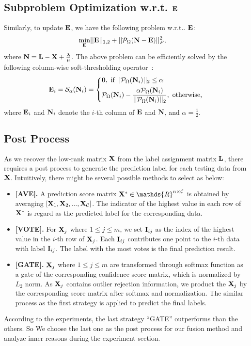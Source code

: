 \documentclass[letterpaper]{article} %
\def\calP{\mathcal{P}}
\def\bN{{\bf N}}
\def\bI{{\bf I}}
\def\bE{{\bf E}}
\def\blambda{{\bm \lambda}}
\def\calC{{\mathcal{C}}}
\def\calS{{\mathcal{S}}}
\def\bL{{\bf L}}
\def\dsR{\mathds{R}}
\def\bX{{\bf X}}
\def\bI{{\bf I}}
\def\bX{{\bf X}}
\def\zerocolumn{{\bf 0}}
\def\wrt{\emph{w.r.t}}
\def\wrt{w.r.t.} \def\dof{d.o.f.}
\begin{document}
\subsection{Subproblem Optimization w.r.t. $\bE$}

Similarly, to update $\bE$, we have the following problem \wrt. $\bE$:
{
\begin{align}
\label{eq:subproblem_wrt_E_2}
  \min_{\bE} & || \bE ||_{1,2} + || \calP_{\Omega} (\bN - \bE) ||_F^2 ,
\end{align}
}
\noindent
where $\bN = \bL - \bX + \frac{\blambda}{\mu}$.
The above problem can be efficiently solved by the following column-wise soft-thresholding operator~\cite{xiao2015FaLRR}:
{
\begin{align}\label{eq:column_wise_soft_thresholding}
  \bE_{i} = \calS_{\alpha}(\bN_{i}) = \left\{
    \begin{aligned}
      & \zerocolumn,~\text{if}~ ||\calP_{\Omega} (\bN_{i})||_2 \leq \alpha   \\
      & \calP_{\Omega} (\bN_{i}) - \frac{\alpha \calP_{\Omega} (\bN_{i})}{|| \calP_{\Omega} (\bN_{i}) ||_2},~\text{otherwise,}
    \end{aligned}
    \right.
\end{align}
}
\noindent
where $\bE_{i}$ and $\bN_{i}$ denote the $i$-th column of $\bE$ and $\bN$,
and $\alpha = \frac{1}{2}$.

\subsection{Post Process}
As we recover the low-rank matrix $\bX$ from the label assignment matrix $\bL$,
there requires a post process to generate the prediction label for each testing data from $\bX$.
Intuitively, there might be several possible methods to select as below:

\begin{itemize}
  \item \textbf{[AVE].} A prediction score matrix $\bX^{*} \in \dsR^{n \times {\calC}}$ is obtained by averaging $[ \bX_1, \bX_2, ..., \bX_{\calC}]$.
    The indicator of the highest value in each row of $\bX^{*}$ is regard as the predicted label for the corresponding data.
  \item \textbf{[VOTE].} For $\bX_j$ where $1 \leq j \leq m$, we set $\bI_{ij}$ as the index of the highest value in the $i$-th row of $\bX_j$.
      Each $\bI_{ij}$ contributes one point to the $i$-th data with label $\bI_{ij}$.
      The label with the most votes is the final prediction result.
  \item \textbf{[GATE].} $\bX_j$ where $1 \leq j \leq m$ are transformed through softmax function as a gate of the corresponding confidence score matrix, which is normalized by $L_2$ norm.
      As $\bX_j$ contains outlier rejection information, we product the $\bX_j$ by the corresponding score matrix after softmax and normalization.
      The similar process as the first strategy is applied to predict the final labels.
\end{itemize}
According to the experiments, the last strategy ``GATE'' outperforms than the others.
So We choose the last one as the post process for our fusion method and analyze inner reasons during the experiment section.
\end{document}
